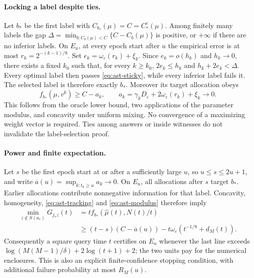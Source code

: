 \documentclass{article}
\theoremstyle{plain}
\theoremstyle{definition}
\begin{document}
\paragraph{Locking a label despite ties.}
Let $b_*$ be the first label with $C_{b_*}(\mu)=C=C_*^\varepsilon(\mu)$.
Among finitely many labels the gap
$\Delta=\min_{b:C_b(\mu)<C}\{C-C_b(\mu)\}$ is positive, or $+\infty$
if there are no inferior labels.  On $E_u$, at every epoch start after $u$
the empirical error is at most $r_k=2^{-(k-1)/8}$.  Set
$e_k=\omega_\varepsilon(r_k)+\xi_k$.  Since $e_k=o(h_k)$ and $h_k\to0$,
there exists a fixed $k_0$ such that, for every $k\ge k_0$,
$2e_k\le h_k$ and $h_k+2e_k<\Delta$.
Every optimal label then passes \eqref{eq:ast-sticky}, while every inferior
label fails it.  The selected label is therefore exactly $b_*$.
Moreover its target allocation obeys
\begin{equation}
 f_{b_*}(\mu,v^k)\ge C-a_k,
 \qquad a_k=\gamma_kD_\varepsilon+2\omega_\varepsilon(r_k)+\xi_k\longrightarrow0.
 \label{eq:ast-allocation-rate}
\end{equation}
This follows from the oracle lower bound, two applications of the parameter
modulus, and concavity under uniform mixing.  No convergence of a maximizing
weight vector is required.  Ties among answers or inside witnesses do not
invalidate the label-selection proof.

\paragraph{Power and finite expectation.}
Let $s$ be the first epoch start at or after a sufficiently large $u$,
so $u\le s\le2u+1$, and write $\overline a(u)=\sup_{k:t_k\ge u}a_k\to0$.
On $E_u$, all allocations after $s$ target $b_*$.  Earlier allocations
contribute nonnegative information for that label.  Concavity, homogeneity,
\eqref{eq:ast-tracking} and \eqref{eq:ast-modulus} therefore imply
\begin{align}
 \min_{z\notin S(a_*)}G_{j_*z}(t)
 &=t f_{b_*}(\widehat\mu(t),N(t)/t)\nonumber\\
 &\ge(t-s)(C-\overline a(u))
       -t\omega_\varepsilon(t^{-1/8}+d_M(t)).
 \label{eq:ast-power}
\end{align}
Consequently a square query time $t$ certifies on $E_u$ whenever the last
line exceeds
$\log(M(M-1)/\delta)+2\log(t+1)+2$; the two units pay for the numerical
enclosures.  This is also an explicit finite-confidence stopping condition,
with additional failure probability at most $R_M(u)$.
\end{document}

